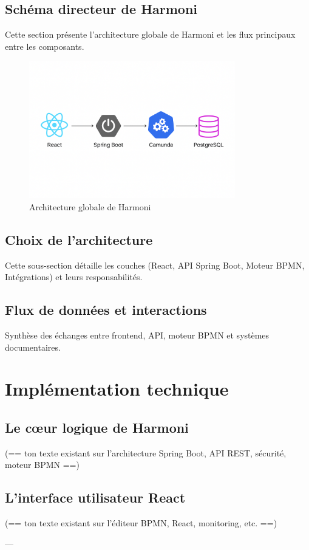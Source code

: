 \subsection{Schéma directeur de Harmoni}
Cette section présente l'architecture globale de Harmoni et les flux principaux entre les composants.
\begin{figure}[h]
    \centering
    \includegraphics[width=0.8\textwidth]{Images/Architecture.png}
    \caption{Architecture globale de Harmoni}
    \label{fig:harmoni_global_architecture}
\end{figure}

\subsection{Choix de l’architecture}
Cette sous-section détaille les couches (React, API Spring Boot, Moteur BPMN, Intégrations) et leurs responsabilités.

\subsection{Flux de données et interactions}
Synthèse des échanges entre frontend, API, moteur BPMN et systèmes documentaires.

\section{Implémentation technique}

\subsection{Le cœur logique de Harmoni}
(== ton texte existant sur l’architecture Spring Boot, API REST, sécurité, moteur BPMN ==)

\subsection{L’interface utilisateur React}
(== ton texte existant sur l’éditeur BPMN, React, monitoring, etc. ==)

---
